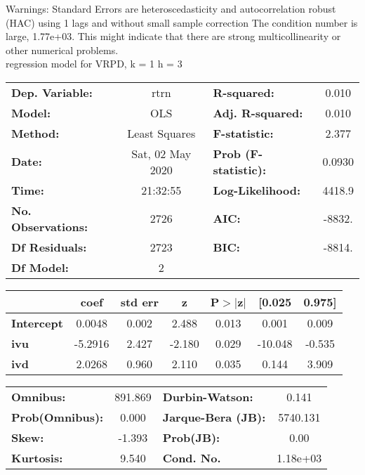 Warnings: \newline
 [1] Standard Errors are heteroscedasticity and autocorrelation robust (HAC) using 1 lags and without small sample correction \newline
 [2] The condition number is large, 1.77e+03. This might indicate that there are \newline
 strong multicollinearity or other numerical problems.\\ 

regression model for VRPD, k = 1 h = 3\begin{center}
\begin{tabular}{lclc}
\toprule
\textbf{Dep. Variable:}    &       rtrn       & \textbf{  R-squared:         } &     0.010   \\
\textbf{Model:}            &       OLS        & \textbf{  Adj. R-squared:    } &     0.010   \\
\textbf{Method:}           &  Least Squares   & \textbf{  F-statistic:       } &     2.377   \\
\textbf{Date:}             & Sat, 02 May 2020 & \textbf{  Prob (F-statistic):} &   0.0930    \\
\textbf{Time:}             &     21:32:55     & \textbf{  Log-Likelihood:    } &    4418.9   \\
\textbf{No. Observations:} &        2726      & \textbf{  AIC:               } &    -8832.   \\
\textbf{Df Residuals:}     &        2723      & \textbf{  BIC:               } &    -8814.   \\
\textbf{Df Model:}         &           2      & \textbf{                     } &             \\
\bottomrule
\end{tabular}
\begin{tabular}{lcccccc}
                   & \textbf{coef} & \textbf{std err} & \textbf{z} & \textbf{P$> |$z$|$} & \textbf{[0.025} & \textbf{0.975]}  \\
\midrule
\textbf{Intercept} &       0.0048  &        0.002     &     2.488  &         0.013        &        0.001    &        0.009     \\
\textbf{ivu}       &      -5.2916  &        2.427     &    -2.180  &         0.029        &      -10.048    &       -0.535     \\
\textbf{ivd}       &       2.0268  &        0.960     &     2.110  &         0.035        &        0.144    &        3.909     \\
\bottomrule
\end{tabular}
\begin{tabular}{lclc}
\textbf{Omnibus:}       & 891.869 & \textbf{  Durbin-Watson:     } &    0.141  \\
\textbf{Prob(Omnibus):} &   0.000 & \textbf{  Jarque-Bera (JB):  } & 5740.131  \\
\textbf{Skew:}          &  -1.393 & \textbf{  Prob(JB):          } &     0.00  \\
\textbf{Kurtosis:}      &   9.540 & \textbf{  Cond. No.          } & 1.18e+03  \\
\bottomrule
\end{tabular}
\end{center}

